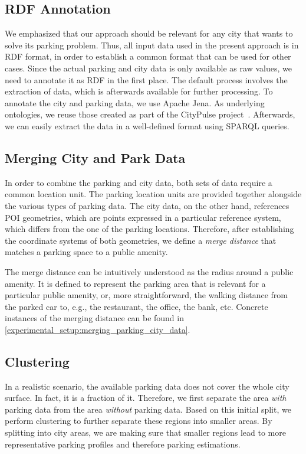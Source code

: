 \subsection{RDF Annotation}
We emphasized that our approach should be relevant for any city that wants to solve its parking problem. Thus, all input data used in the present approach is in RDF format, in order to establish a common format that can be used for other cases.
Since the actual parking and city data is only available as raw values, we need to annotate it as RDF in the first place.
The default process involves the extraction of data, which is afterwards available for further processing. To annotate the city and parking data, we use Apache Jena. As underlying ontologies, we reuse those created as part of the CityPulse project~\cite{city_pulse}. Afterwards, we can easily extract the data in a well-defined format using SPARQL queries. 

\subsection{Merging City and Park Data}
In order to combine the parking and city data, both sets of data require a common location unit. 
The parking location units are provided together alongside the various types of parking data. 
The city data, on the other hand, references POI geometries, which are points expressed in a particular reference system, which differs from the one of the parking locations.
Therefore, after establishing the coordinate systems of both geometries, we define a \textit{merge distance} that matches a parking space to a public amenity. 

The merge distance can be intuitively understood as the radius around a public amenity. It is defined to represent the parking area that is relevant for a particular public amenity, or, more straightforward, the walking distance from the parked car to, e.g., the restaurant, the office, the bank, etc. Concrete instances of the merging distance can be found in \cref{experimental_setup:merging_parking_city_data}.

\subsection{Clustering}
\label{concept:clustering}
In a realistic scenario, the available parking data does not cover the whole city surface. In fact, it is a fraction of it. Therefore, we first separate the area \textit{with} parking data from the area \textit{without} parking data. Based on this initial split, we perform clustering to further separate these regions into smaller areas. By splitting into city areas, we are making sure that smaller regions lead to more representative parking profiles and therefore parking estimations. 

